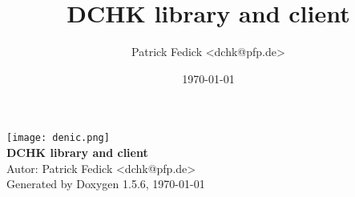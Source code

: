 \documentclass[a4paper]{book}
\author{Patrick Fedick <dchk@pfp.de>}
\title{DCHK library and client}
\date{\today}
\begin{document}
\begin{titlepage}
\vspace*{5cm}
\begin{center}
\texttt{[image: denic.png]}\\
\vspace*{1cm}
{\Huge \bf {DCHK library and client}}\\
\vspace*{1cm}
\large {Autor: Patrick Fedick <dchk@pfp.de>}\\
\vspace*{1cm}
{\large Generated by Doxygen 1.5.6, \today}\\
\vspace*{0.5cm}
\small 
\end{center}
\end{titlepage}
\clearemptydoublepage
{}
\tableofcontents
\clearemptydoublepage
{}
\end{document}
